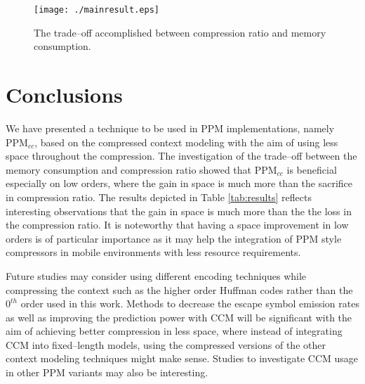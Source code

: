 \documentclass[runningheads,a4paper]{llncs}
\begin{document}
\begin{figure}
 \begin{center}
 \texttt{[image: ./mainresult.eps]}
\end{center}
\caption{The trade--off accomplished between compression ratio and memory consumption.}
\label{fig:mainresult}
\end{figure} 
 
\section{Conclusions}

We have presented a technique to be used in PPM implementations, namely PPM$_{cc}$, based on the
compressed context modeling with the aim of using less space throughout the compression. 
The investigation of the trade--off between the memory consumption and  compression ratio showed that PPM$_{cc}$ is
beneficial especially on low orders, where the gain in space is much more than the sacrifice in compression ratio. The
results depicted in Table \ref{tab:results} reflects interesting observations that the gain in space is much more than
the the loss in the compression ratio. 
It is noteworthy that having a space improvement in low orders is of particular importance as it may help 
the integration of PPM style compressors in mobile environments with less resource requirements. 

Future studies may consider using different encoding techniques while compressing the context such as the higher
order Huffman codes rather than the $0^{th}$ order used in this work. 
Methods to decrease the escape symbol emission rates as well as improving the prediction power with CCM will be
significant with the aim of achieving better compression in less space, where instead of integrating CCM into 
fixed--length models, using the compressed versions of the other context modeling techniques might make sense. 
Studies to investigate CCM usage in other PPM variants may also be interesting. 





\end{document}
